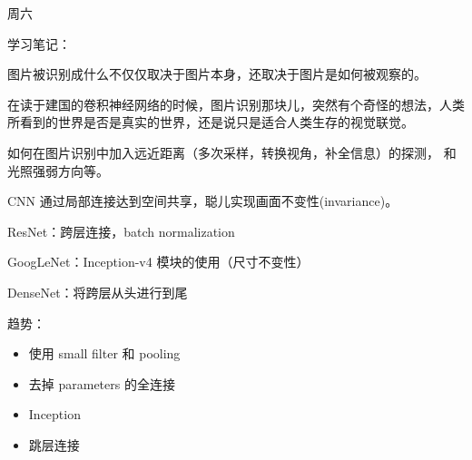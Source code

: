 

周六

学习笔记：

图片被识别成什么不仅仅取决于图片本身，还取决于图片是如何被观察的。

在读于建国的卷积神经网络的时候，图片识别那块儿，突然有个奇怪的想法，人类
所看到的世界是否是真实的世界，还是说只是适合人类生存的视觉联觉。

如何在图片识别中加入远近距离（多次采样，转换视角，补全信息）的探测，
和光照强弱方向等。

CNN 通过局部连接达到空间共享，聪儿实现画面不变性(invariance)。

ResNet：跨层连接，batch normalization

GoogLeNet：Inception-v4 模块的使用（尺寸不变性）

DenseNet：将跨层从头进行到尾

趋势：
\begin{itemize}
    \item 使用 small filter 和 pooling
    \item 去掉 parameters 的全连接
    \item Inception
    \item 跳层连接
\end{itemize}

